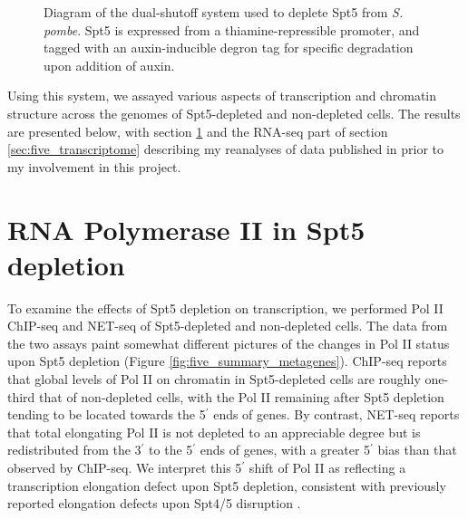 \begin{wrapfigure}[9]{r}{3in}
    \caption[Diagram of the dual-shutoff system used to deplete Spt5 from \textit{S. pombe}]{Diagram of the dual-shutoff system used to deplete Spt5 from \textit{S. pombe}. Spt5 is expressed from a thiamine-repressible promoter, and tagged with an auxin-inducible degron tag for specific degradation upon addition of auxin.}
    \label{fig:five_depletion_diagram}
\end{wrapfigure}

Using this system, we assayed various aspects of transcription and chromatin structure across the genomes of Spt5-depleted and non-depleted cells.
The results are presented below, with section \ref{sec:five_pol_ii} and the RNA-seq part of section \ref{sec:five_transcriptome} describing my reanalyses of data published in \citet{shetty2017} prior to my involvement in this project.

\section{RNA Polymerase II in Spt5 depletion}
\label{sec:five_pol_ii}

To examine the effects of Spt5 depletion on transcription, we performed Pol II ChIP-seq and NET-seq of Spt5-depleted and non-depleted cells.
The data from the two assays paint somewhat different pictures of the changes in Pol II status upon Spt5 depletion (Figure \ref{fig:five_summary_metagenes}).
ChIP-seq reports that global levels of Pol II on chromatin in Spt5-depleted cells are roughly one-third that of non-depleted cells, with the Pol II remaining after Spt5 depletion tending to be located towards the 5$^\prime$ ends of genes.
By contrast, NET-seq reports that total elongating Pol II is not depleted to an appreciable degree but is redistributed from the 3$^\prime$ to the 5$^\prime$ ends of genes, with a greater 5$^\prime$ bias than that observed by ChIP-seq.
We interpret this 5$^\prime$ shift of Pol II as reflecting a transcription elongation defect upon Spt5 depletion, consistent with previously reported elongation defects upon Spt4/5 disruption \citep{diamant2016,kramer2016,liu2012,mason2005,morillon2003,quan2010,rondon2003}.

